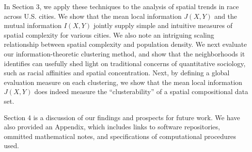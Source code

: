 	In Section 3, we apply these techniques to the analysis of spatial trends in race across U.S. cities. We show that the mean local information $J(X,Y)$ and the mutual information $I(X,Y)$ jointly supply simple and intuitive measures of spatial complexity for various cities. We also note an intriguing scaling relationship between spatial complexity and population density. We next evaluate our information-theoretic clustering method, and show that the neighborhoods it identifies can usefully shed light on traditional concerns of quantitative sociology, such as racial affinities and spatial concentration. Next, by defining a global evaluation measure on each clustering, we show that the mean local information $J(X,Y)$ does indeed measure the ``clusterability'' of a spatial compositional data set. 

	Section 4 is a discussion of our findings and prospects for future work. We have also provided an Appendix, which includes links to software repositories, ommitted mathematical notes, and specifications of computational procedures used. 